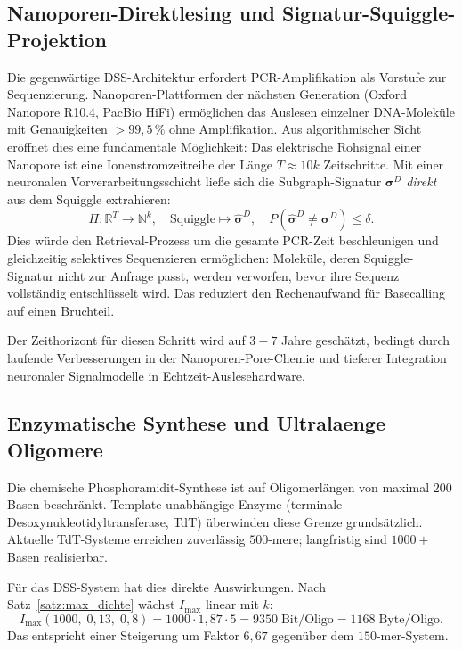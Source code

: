 ﻿\documentclass[a4paper,12pt]{article}
\theoremstyle{definition}
\theoremstyle{plain}
\begin{document}
\subsection{Nanoporen-Direktlesing und Signatur-Squiggle-Projektion}
\label{ssec:nanopore}

Die gegenwärtige DSS-Architektur erfordert PCR-Amplifikation als
Vorstufe zur Sequenzierung.  Nanoporen-Plattformen der nächsten Generation
(Oxford Nanopore R10.4, PacBio HiFi) ermöglichen das Auslesen einzelner
DNA-Moleküle mit Genauigkeiten $> 99{,}5\,\%$ ohne Amplifikation.
Aus algorithmischer Sicht eröffnet dies eine fundamentale Möglichkeit:
Das elektrische Rohsignal einer Nanopore ist eine Ionenstromzeitreihe der
Länge $T \approx 10k$ Zeitschritte.  Mit einer neuronalen Vorverarbeitungsschicht
ließe sich die Subgraph-Signatur $\boldsymbol{\sigma}^D$ \emph{direkt} aus
dem Squiggle extrahieren:
\[
  \Pi: \mathbb{R}^T \to \mathbb{N}^k,
  \quad \text{Squiggle} \mapsto \hat{\boldsymbol{\sigma}}^D,
  \quad P(\hat{\boldsymbol{\sigma}}^D \neq \boldsymbol{\sigma}^D) \le \delta.
\]
Dies würde den Retrieval-Prozess um die gesamte PCR-Zeit beschleunigen und
gleichzeitig selektives Sequenzieren ermöglichen: Moleküle, deren
Squiggle-Signatur nicht zur Anfrage passt, werden verworfen, bevor ihre
Sequenz vollständig entschlüsselt wird.  Das reduziert den Rechenaufwand
für Basecalling auf einen Bruchteil.

Der Zeithorizont für diesen Schritt wird auf $3{-}7$ Jahre geschätzt,
bedingt durch laufende Verbesserungen in der Nanoporen-Pore-Chemie und
tieferer Integration neuronaler Signalmodelle in Echtzeit-Auslesehardware.

\subsection{Enzymatische Synthese und Ultralaenge Oligomere}
\label{ssec:enzymatisch}

Die chemische Phosphoramidit-Synthese ist auf Oligomerlängen von maximal
$200$ Basen beschränkt.  Template-unabhängige Enzyme (terminale
Desoxynukleotidyltransferase, TdT) überwinden diese Grenze grundsätzlich.
Aktuelle TdT-Systeme erreichen zuverlässig $500$-mere; langfristig sind
$1000+$ Basen realisierbar.

Für das DSS-System hat dies direkte Auswirkungen.  Nach
Satz~\ref{satz:max_dichte} wächst $I_{\max}$ linear mit $k$:
\[
  I_{\max}(1000,\; 0{,}13,\; 0{,}8) = 1000 \cdot 1{,}87 \cdot 5
  = 9350\;\text{Bit/Oligo} = 1168\;\text{Byte/Oligo}.
\]
Das entspricht einer Steigerung um Faktor $6{,}67$ gegenüber dem
$150$-mer-System.
\end{document}

